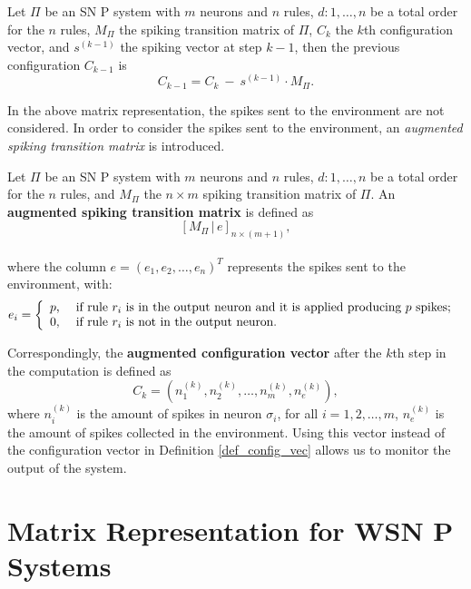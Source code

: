 \documentclass[runningheads]{llncs}
\begin{document}
\begin{corollary}
Let $\Pi$ be an SN P system with $m$ neurons and $n$ rules,
$d:1,\dots, n$ be a total order for the $n$ rules, $M_{\Pi}$ the
spiking transition matrix of $\Pi$, $C_k$ the $k$th configuration
vector, and $s^{(k-1)}$ the spiking vector at step $k-1$, then the
previous configuration $C_{k-1}$ is
\begin{equation}\label{next-config}
C_{k-1} =  C_{k} ~ -  ~ s^{(k-1)}\cdot M_{\Pi}.
\end{equation}
\end{corollary}

In the above matrix representation, the spikes sent to the
environment are not considered. In order to consider the spikes sent
to the environment, an {\it augmented spiking transition matrix} is
introduced.

\begin{definition}
Let $\Pi$ be an SN P system with $m$ neurons and $n$ rules,
$d:1,\dots, n$ be a total order for the $n$ rules, and $M_{\Pi}$ the
$n \times m$ spiking transition matrix of $\Pi$. An {\bf augmented
spiking transition matrix} is defined as
$$[M_{\Pi}\, |\, e]_{n \times (m+1)},$$\\
where the column $e=(e_1, e_2, \dots, e_n)^T$ represents the spikes
sent to the environment, with:
$$
e_{i} = \left\{
\begin{array}{rl}
 p, &\mbox{ \rm if rule $r_i$ is in the output neuron and it is applied producing $p$ spikes; } \\
 0, &\mbox{ \rm if rule $r_i$ is not in the output neuron. } \\
    \end{array}
\right.
$$
\end{definition}

Correspondingly, the {\bf augmented configuration vector} after the
$k$th step in the computation is defined as
$$C_{k} = (n_{1}^{(k)}, n_{2}^{(k)}, \ldots , n_{m}^{(k)},
n_{e}^{(k)}),$$ where $n_{i}^{(k)}$ is the amount of spikes in
neuron $\sigma_i$, for all $i=1,2, \ldots, m$, $n_{e}^{(k)}$ is the
amount of spikes collected in the environment. Using this vector
instead of the configuration vector in Definition
\ref{def_config_vec} allows us to monitor the output of the system.

\section{Matrix Representation for WSN P Systems}\label{Mat-WTSNP}
\end{document}
